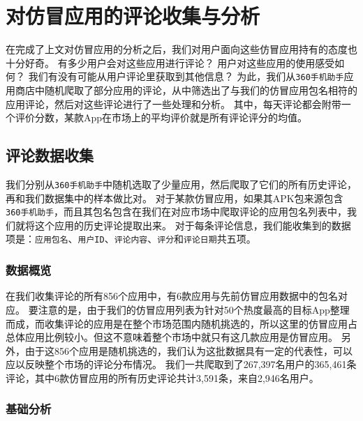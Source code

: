 \chapter{对仿冒应用的评论收集与分析}
\label{chp:feedback}

在完成了上文对仿冒应用的分析之后，我们对用户面向这些仿冒应用持有的态度也十分好奇。
有多少用户会对这些应用进行评论？
用户对这些应用的使用感受如何？
我们有没有可能从用户评论里获取到其他信息？
为此，我们从\texttt{360手机助手}应用商店中随机爬取了部分应用的评论，从中筛选出了与我们的仿冒应用包名相符的应用评论，然后对这些评论进行了一些处理和分析。
其中，每天评论都会附带一个评价分数，某款App在市场上的平均评价就是所有评论评分的均值。

\section{评论数据收集}
我们分别从\texttt{360手机助手}中随机选取了少量应用，然后爬取了它们的所有历史评论，再和我们数据集中的样本做比对。
对于某款仿冒应用，如果其APK包来源包含\texttt{360手机助手}，而且其包名包含在我们在对应市场中爬取评论的应用包名列表中，我们就将这个应用的历史评论提取出来。
对于每条评论信息，我们能收集到的数据项是：\texttt{应用包名}、\texttt{用户ID}、\texttt{评论内容}、\texttt{评分}和\texttt{评论日期}共五项。

\subsection{数据概览}
在我们收集评论的所有856个应用中，有6款应用与先前仿冒应用数据中的包名对应。
要注意的是，由于我们的仿冒应用列表为针对50个热度最高的目标App整理而成，而收集评论的应用是在整个市场范围内随机挑选的，所以这里的仿冒应用占总体应用比例较小。但这不意味着整个市场中就只有这几款应用是仿冒应用。
另外，由于这856个应用是随机挑选的，我们认为这批数据具有一定的代表性，可以应以反映整个市场的评论分布情况。
我们一共爬取到了267,397名用户的365,461条评论，其中6款仿冒应用的所有历史评论共计3,591条，来自2,946名用户。

\subsection{基础分析}

%
%
%

